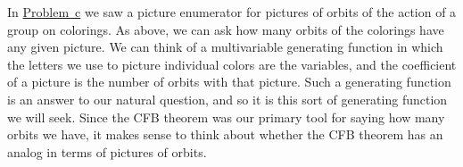 \documentclass[10pt,]{book}
\theoremstyle{plain}
\theoremstyle{definition}
\theoremstyle{definition}
\numberwithin{equation}{chapter}
\begin{document}
\hypertarget{p-1742}{}%
In \hyperref[picture-enumerator-hexagon]{Problem~c} we saw a picture enumerator for pictures of orbits of the action of a group on colorings. As above, we can ask how many orbits of the colorings have any given picture. We can think of a multivariable generating function in which the letters we use to picture individual colors are the variables, and the coefficient of a picture is the number of orbits with that picture. Such a generating function is an answer to our natural question, and so it is this sort of generating function we will seek. Since the CFB theorem was our primary tool for saying how many orbits we have, it makes sense to think about whether the CFB theorem has an analog in terms of pictures of orbits.%
\typeout{************************************************}
\typeout{************************************************}
\end{document}
